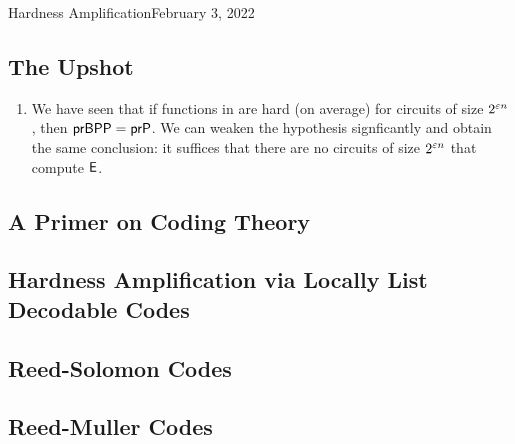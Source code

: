 \begin{lecture}{3}{Hardness Amplification}{February 3, 2022}
\label{lec:03}

\subsection*{The Upshot}

\begin{enumerate}
  \item We have seen that if functions in \E are hard (on average) for circuits
    of size $2^{\varepsilon n}$, then $\textsf{prBPP} = \textsf{prP}$. We can weaken the hypothesis
    signficantly and obtain the same conclusion: it suffices that there are
    no circuits of size $2^{\varepsilon n}$ that compute $\textsf{E}$.
\end{enumerate}
  

\subsection{A Primer on Coding Theory}

\subsection{Hardness Amplification via Locally List Decodable Codes}

\subsection{Reed-Solomon Codes}

\subsection{Reed-Muller Codes}

\end{lecture}
